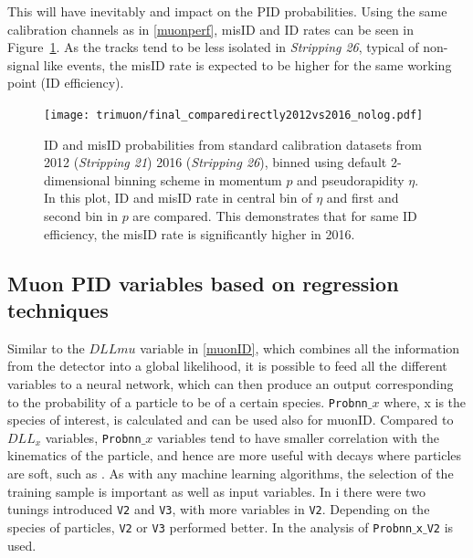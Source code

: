This will have inevitably and impact on the \gls{PID} probabilities. Using the same calibration channels as in \autoref{muonperf}, misID and ID rates can be seen in Figure~\ref{fig:nSharedRun1andRun2}. As the tracks tend to be less isolated in \textit{Stripping 26}, typical of non-signal like events, the misID rate is expected to be higher for the same working point (ID efficiency).

\begin{figure}[h!]
\centering
\texttt{[image: trimuon/final\_comparedirectly2012vs2016\_nolog.pdf]}
	\caption{ID and misID probabilities from standard calibration datasets from 2012 (\textit{Stripping 21}) 2016 (\textit{Stripping 26}), binned using default 2-dimensional binning scheme in momentum $p$ and pseudorapidity $\eta$. In this plot, ID and misID rate in central bin of $\eta$ and first and second bin in $p$ are compared. This demonstrates that for same ID efficiency, the misID rate is significantly higher in 2016.}
\label{fig:nSharedRun1andRun2}
\end{figure}

\subsection{Muon PID variables based on regression techniques }
Similar to the $DLLmu$ variable in \autoref{muonID}, which combines all the information from the detector into a global likelihood, it is possible to feed all the different variables to a neural network, which can then produce an output 
corresponding to the probability of a particle to be of a certain species. \texttt{Probnn$\_{x}$} where, x is the species of interest, is calculated and can be used also for muonID. Compared to $DLL_{x}$ variables, \texttt{Probnn$\_{x}$} variables tend to have smaller correlation with the kinematics of the particle, and hence are more useful with decays where particles are soft, such as \Bmumumu. As with any machine learning algorithms, the selection of the training sample is important as well as input variables. In \Rn{1} there were two tunings introduced \texttt{V2} and \texttt{V3}, with more variables in \texttt{V2}. Depending on the species of particles, \texttt{V2} or \texttt{V3} performed better. In the analysis of \Bmumumu \texttt{Probnn$\_${x}$\_$V2} is used.


